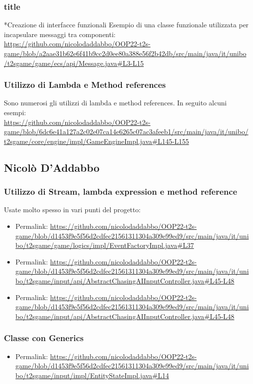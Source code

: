 \documentclass[a4paper,12pt]{report}
\begin{document}
\subsubsection*{title}*{Creazione di interfacce funzionali}
Esempio di una classe funzionale utilizzata per incapsulare messaggi tra componenti:
\\
\url{https://github.com/nicolodaddabbo/OOP22-t2s-game/blob/a2aae31b62e6f41b9cc2d0ee80a388e56f2b42db/src/main/java/it/unibo/t2sgame/game/ecs/api/Message.java#L3-L15}
\subsubsection*{Utilizzo di Lambda e Method references}
Sono numerosi gli utilizzi di lambda e method references. In seguito alcuni esempi: 
\\
\url{https://github.com/nicolodaddabbo/OOP22-t2s-game/blob/6dc6e41a127a2c02e07ca14e6265c07ac3afeeb1/src/main/java/it/unibo/t2sgame/core/engine/impl/GameEngineImpl.java#L145-L155}


\subsection*{Nicolò D'Addabbo}
\subsubsection*{Utilizzo di Stream, lambda expression e method reference}
Usate molto spesso in vari punti del progetto:
\begin{itemize}
	\item Permalink: \url{https://github.com/nicolodaddabbo/OOP22-t2s-game/blob/d1453f9e5f56d2cdfec21561311304a309e99ed9/src/main/java/it/unibo/t2sgame/game/logics/impl/EventFactoryImpl.java#L37}
	\item Permalink: \url{https://github.com/nicolodaddabbo/OOP22-t2s-game/blob/d1453f9e5f56d2cdfec21561311304a309e99ed9/src/main/java/it/unibo/t2sgame/input/api/AbstractChasingAIInputController.java#L45-L48}
	\item Permalink: \url{https://github.com/nicolodaddabbo/OOP22-t2s-game/blob/d1453f9e5f56d2cdfec21561311304a309e99ed9/src/main/java/it/unibo/t2sgame/input/api/AbstractChasingAIInputController.java#L45-L48}
\end{itemize}
\subsubsection*{Classe con Generics}
\begin{itemize}
	\item Permalink: \url{https://github.com/nicolodaddabbo/OOP22-t2s-game/blob/d1453f9e5f56d2cdfec21561311304a309e99ed9/src/main/java/it/unibo/t2sgame/input/impl/EntityStateImpl.java#L14}
\end{itemize}
\end{document}
